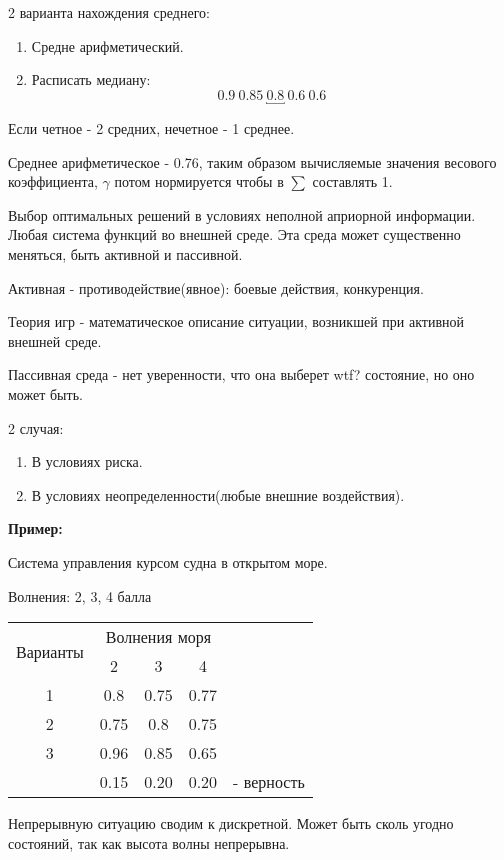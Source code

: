 \documentclass[12pt,a5paper]{scrbook}
\begin{document}
  2 варианта нахождения среднего:
  \begin{enumerate}
    \item Средне арифметический.
    \item Расписать медиану:$$0.9 \ 0.85 \ \underbracket{0.8} \ 0.6 \ 0.6$$
  \end{enumerate}

  Если четное - 2 средних, нечетное - 1 среднее.

  Среднее арифметическое - 0.76, таким образом вычисляемые значения весового коэффициента, $\gamma$ потом нормируется чтобы в $\sum$ составлять 1.

  Выбор оптимальных решений в условиях неполной априорной информации. Любая система функций во внешней среде. Эта среда может существенно меняться, быть активной и пассивной.

  Активная - противодействие(явное): боевые действия, конкуренция.

  Теория игр - математическое описание ситуации, возникшей при активной внешней среде.

  Пассивная среда - нет уверенности, что она выберет wtf? состояние, но оно может быть.

  2 случая:
  \begin{enumerate}
    \item В условиях риска.
    \item В условиях неопределенности(любые внешние воздействия).
  \end{enumerate}

  \textbf{Пример:}

  Система управления курсом судна в открытом море.

  Волнения: 2, 3, 4 балла

  \begin{tabular}{c|c|c|cl}
    \cline{1-4}
    \multirow{2}{*}{Варианты} & \multicolumn{3}{c}{Волнения моря}&\\
    \cline{2-4}
    & 2 & 3 & 4&\\
    \cline{1-4}
    1 & 0.8 & 0.75 & 0.77&\\
    \cline{1-4}
    2 & 0.75 & 0.8 & 0.75&\\
    \cline{1-4}
    3 & 0.96 & 0.85 & 0.65&\\
    \cline{1-4}
    & 0.15 & 0.20 & 0.20 & - верность
  \end{tabular}

  Непрерывную ситуацию сводим к дискретной. Может быть сколь угодно состояний, так как высота волны непрерывна.
\end{document}
